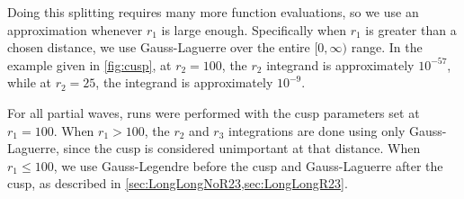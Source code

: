 \documentclass[Dissertation.tex]{subfiles}
\begin{document}
Doing this splitting requires many more function evaluations, so we use an 
approximation whenever $r_1$ is large enough. Specifically when $r_1$ is 
greater than a chosen distance, we use Gauss-Laguerre over the entire
$[0,\infty)$ range. 
In the example given in \cref{fig:cusp}, at $r_2 = 100$, the $r_2$ integrand 
is approximately $10^{-57}$, while at $r_2 = 25$, the integrand is 
approximately $10^{-9}$.

For all partial waves, runs were performed with the cusp parameters set at
$r_1 = 100$. When $r_1 > 100$, the $r_2$ and $r_3$ integrations are done using only 
Gauss-Laguerre, since the cusp is considered unimportant at that distance. 
When $r_1 \leq 100$, we use Gauss-Legendre before the cusp and Gauss-Laguerre 
after the cusp, as described in \cref{sec:LongLongNoR23,sec:LongLongR23}. 
\end{document}
